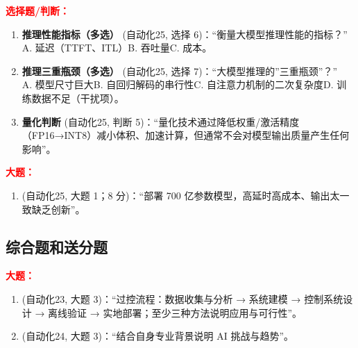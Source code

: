 ﻿\documentclass[../main.tex]{subfiles}
\begin{document}
\noindent\textbf{\textcolor{red}{选择题/判断：}}
\begin{enumerate}[itemsep=0.45em, topsep=0.2em, leftmargin=1.5em]
    \item \textbf{推理性能指标（多选）} \textcolor{autoclassgreen}{(自动化25, 选择 6)}：``衡量大模型推理性能的指标？''\\
    A. 延迟（TTFT、ITL）\quad B. 吞吐量\quad C. 成本\quad {}。 

    \item \textbf{推理三重瓶颈（多选）} \textcolor{autoclassgreen}{(自动化25, 选择 7)}：``大模型推理的''三重瓶颈''？''\\
    A. 模型尺寸巨大\quad B. 自回归解码的串行性\quad C. 自注意力机制的二次复杂度\quad D. 训练数据不足（干扰项）。 

    \item \textbf{量化判断} \textcolor{autoclassgreen}{(自动化25, 判断 5)}：``量化技术通过降低权重/激活精度（FP16→INT8）减小体积、加速计算，但通常不会对模型输出质量产生任何影响''。 
\end{enumerate}

\noindent\textbf{\textcolor{red}{大题：}}
\begin{enumerate}[itemsep=0.3em, topsep=0.2em, leftmargin=1.5em]
    \item \textcolor{autoclassgreen}{(自动化25, 大题 1；8 分)}：``部署 700 亿参数模型，高延时高成本、输出太一致缺乏创新''。 
\end{enumerate}

\subsection{综合题和送分题}

\noindent\textbf{\textcolor{red}{大题：}}
\begin{enumerate}[itemsep=0.3em, topsep=0.2em, leftmargin=1.5em]
    \item \textcolor{autoclassgreen}{(自动化23, 大题 3)}：``过控流程：数据收集与分析 → 系统建模 → 控制系统设计 → 离线验证 → 实地部署；至少三种方法说明应用与可行性''。 
    \item \textcolor{autoclassgreen}{(自动化24, 大题 3)}：``结合自身专业背景说明 AI 挑战与趋势''。
\end{enumerate}
\end{document}
